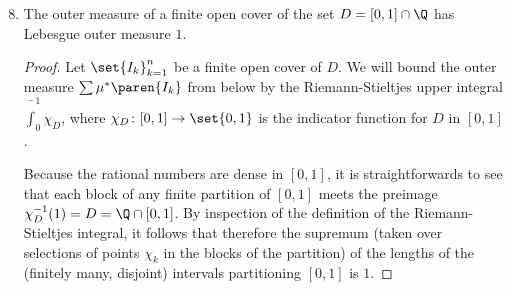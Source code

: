 \documentclass[onesided]{ccg-pset}
\begin{document}
\begin{enumerate}
\setcounter{enumi}{7}
\item The outer measure of a finite open cover of the set $D = [0,1] \cap \Q$ has Lebesgue outer measure $1$.
\begin{proof}
    Let $\set{ I_k }_{k=1}^n$ be a finite open cover of $D$. We will bound the outer measure $\sum \mu^*\paren{I_k}$ from below by the Riemann-Stieltjes upper integral $\bar\int_0^1 \chi_D$, where $\chi_D \colon [0,1] \to \set{0,1}$ is the indicator function for $D$ in $[0,1]$. 

    Because the rational numbers are dense in $[0,1]$, it is straightforwards to see that each block of any finite partition of $[0,1]$ meets the preimage $\chi^{-1}_D(1) = D = \Q \cap [0,1]$. By inspection of the definition of the Riemann-Stieltjes integral, it follows that therefore the supremum (taken over selections of points $\chi_k$ in the blocks of the partition) of the lengths of the (finitely many, disjoint) intervals partitioning $[0,1]$ is $1$.


\end{proof}
\end{enumerate}
\end{document}
